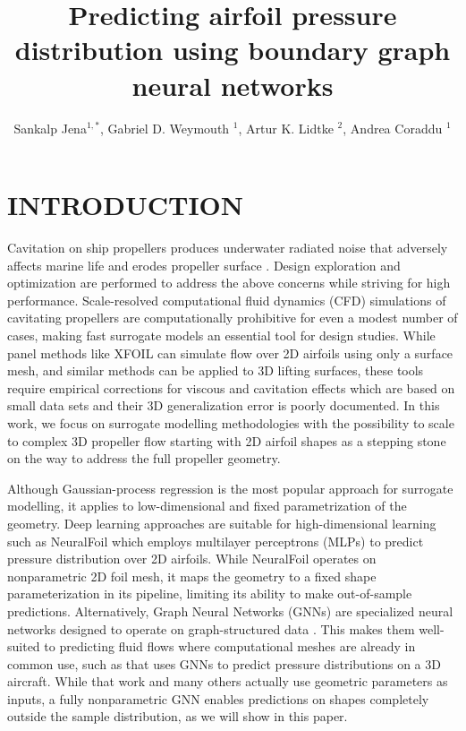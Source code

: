 \documentclass{marine_2025_paper_template}
\title{Predicting airfoil pressure distribution using \break boundary graph neural networks}
\author{Sankalp Jena$^{1, *}$, Gabriel D. Weymouth $^{1}$, Artur K. Lidtke $^{2}$, Andrea Coraddu $^1$}
\begin{document}
\section{INTRODUCTION}

\noindent Cavitation on ship propellers produces underwater radiated noise that adversely affects marine life \citep{basan2024} and erodes propeller surface \citep{dular2015}. Design exploration and optimization are performed to address the above concerns while striving for high performance. Scale-resolved computational fluid dynamics (CFD) simulations of cavitating propellers are computationally prohibitive for even a modest number of cases, making fast surrogate models an essential tool for design studies. While panel methods like XFOIL \citep{drela1989} can simulate flow over 2D airfoils using only a surface mesh, and similar methods can be applied to 3D lifting surfaces, these tools require empirical corrections for viscous and cavitation effects which are based on small data sets and their 3D generalization error is poorly documented. In this work, we focus on surrogate modelling methodologies with the possibility to scale to complex 3D propeller flow starting with 2D airfoil shapes as a stepping stone on the way to address the full propeller geometry. \newline

\noindent Although Gaussian-process regression is the most popular approach for surrogate modelling, it applies to low-dimensional and fixed parametrization of the geometry. Deep learning approaches are suitable for high-dimensional learning such as NeuralFoil \citep{sharpe2024} which employs multilayer perceptrons (MLPs) to predict pressure distribution over 2D airfoils. While NeuralFoil operates on nonparametric 2D foil mesh, it maps the geometry to a fixed shape parameterization in its pipeline, limiting its ability to make out-of-sample predictions. Alternatively, Graph Neural Networks (GNNs) are specialized neural networks designed to operate on graph-structured data \citep{scarselli2009,bronstein2021}. This makes them well-suited to predicting fluid flows where computational meshes are already in common use, such as \cite{immordino2025} that uses GNNs to predict pressure distributions on a 3D aircraft. While that work and many others actually use geometric parameters as inputs, a fully nonparametric GNN enables predictions on shapes completely outside the sample distribution, as we will show in this paper.\newline 
\end{document}
